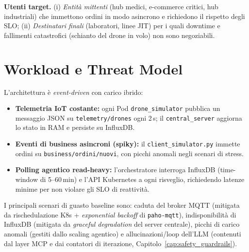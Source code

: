 \textbf{Utenti target.} (i) \textit{Entità mittenti} (hub medici, e-commerce critici, hub industriali) che immettono ordini in modo asincrono e richiedono il rispetto degli SLO; (ii) \textit{Destinatari finali} (laboratori, linee JIT) per i quali downtime e fallimenti catastrofici (schianto del drone in volo) non sono negoziabili.

\section{Workload e Threat Model}
\label{sec:workload_threat}

L'architettura è \textit{event-driven} con carico ibrido:
\begin{itemize}
    \item \textbf{Telemetria IoT costante:} ogni Pod \texttt{drone\_simulator} pubblica un messaggio JSON su \texttt{telemetry/drones} ogni 2\,s; il \texttt{central\_server} aggiorna lo stato in RAM e persiste su InfluxDB.
    \item \textbf{Eventi di business asincroni (spiky):} il \texttt{client\_simulator.py} immette ordini su \texttt{business/ordini/nuovi}, con picchi anomali negli scenari di stress.
    \item \textbf{Polling agentico read-heavy:} l'orchestratore interroga InfluxDB (time-window di 5--60\,min) e l'API Kubernetes a ogni risveglio, richiedendo latenze minime per non violare gli SLO di reattività.
\end{itemize}

I principali scenari di guasto baseline sono: caduta del broker MQTT (mitigata da rischedulazione K8s + \textit{exponential backoff} di \texttt{paho-mqtt}), indisponibilità di InfluxDB (mitigata da \textit{graceful degradation} del server centrale), picchi di carico anomali (gestiti dallo scaling agentico) e allucinazioni/loop dell'LLM (contenuti dal layer MCP e dai contatori di iterazione, Capitolo~\ref{cap:safety_guardrails}).
